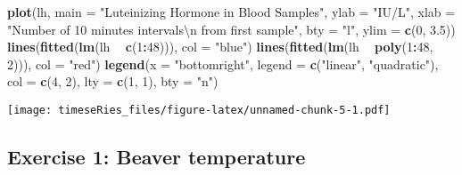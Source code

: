 \documentclass[]{book}
\newenvironment{Shaded}{\begin{snugshade}}{\end{snugshade}}
\newcommand{\CharTok}[1]{\textcolor[rgb]{0.31,0.60,0.02}{#1}}
\newcommand{\DataTypeTok}[1]{\textcolor[rgb]{0.13,0.29,0.53}{#1}}
\newcommand{\DecValTok}[1]{\textcolor[rgb]{0.00,0.00,0.81}{#1}}
\newcommand{\FloatTok}[1]{\textcolor[rgb]{0.00,0.00,0.81}{#1}}
\newcommand{\KeywordTok}[1]{\textcolor[rgb]{0.13,0.29,0.53}{\textbf{#1}}}
\newcommand{\NormalTok}[1]{#1}
\newcommand{\OperatorTok}[1]{\textcolor[rgb]{0.81,0.36,0.00}{\textbf{#1}}}
\newcommand{\StringTok}[1]{\textcolor[rgb]{0.31,0.60,0.02}{#1}}
\begin{document}
\begin{Shaded}
\begin{Highlighting}[]
\KeywordTok{plot}\NormalTok{(lh, }\DataTypeTok{main =} \StringTok{"Luteinizing Hormone in Blood Samples"}\NormalTok{, }\DataTypeTok{ylab =} \StringTok{"IU/L"}\NormalTok{, }\DataTypeTok{xlab =} \StringTok{"Number of 10 minutes intervals}\CharTok{\textbackslash{}n}\StringTok{ from first sample"}\NormalTok{, }
    \DataTypeTok{bty =} \StringTok{"l"}\NormalTok{, }\DataTypeTok{ylim =} \KeywordTok{c}\NormalTok{(}\DecValTok{0}\NormalTok{, }\FloatTok{3.5}\NormalTok{))}
\KeywordTok{lines}\NormalTok{(}\KeywordTok{fitted}\NormalTok{(}\KeywordTok{lm}\NormalTok{(lh }\OperatorTok{~}\StringTok{ }\KeywordTok{c}\NormalTok{(}\DecValTok{1}\OperatorTok{:}\DecValTok{48}\NormalTok{))), }\DataTypeTok{col =} \StringTok{"blue"}\NormalTok{)}
\KeywordTok{lines}\NormalTok{(}\KeywordTok{fitted}\NormalTok{(}\KeywordTok{lm}\NormalTok{(lh }\OperatorTok{~}\StringTok{ }\KeywordTok{poly}\NormalTok{(}\DecValTok{1}\OperatorTok{:}\DecValTok{48}\NormalTok{, }\DecValTok{2}\NormalTok{))), }\DataTypeTok{col =} \StringTok{"red"}\NormalTok{)}
\KeywordTok{legend}\NormalTok{(}\DataTypeTok{x =} \StringTok{"bottomright"}\NormalTok{, }\DataTypeTok{legend =} \KeywordTok{c}\NormalTok{(}\StringTok{"linear"}\NormalTok{, }\StringTok{"quadratic"}\NormalTok{), }\DataTypeTok{col =} \KeywordTok{c}\NormalTok{(}\DecValTok{4}\NormalTok{, }\DecValTok{2}\NormalTok{), }
    \DataTypeTok{lty =} \KeywordTok{c}\NormalTok{(}\DecValTok{1}\NormalTok{, }\DecValTok{1}\NormalTok{), }\DataTypeTok{bty =} \StringTok{"n"}\NormalTok{)}
\end{Highlighting}
\end{Shaded}

\texttt{[image: timeseRies\_files/figure-latex/unnamed-chunk-5-1.pdf]}

\hypertarget{exercise-1-beaver-temperature}{%
\subsection{Exercise 1: Beaver
temperature}\label{exercise-1-beaver-temperature}}
\end{document}
